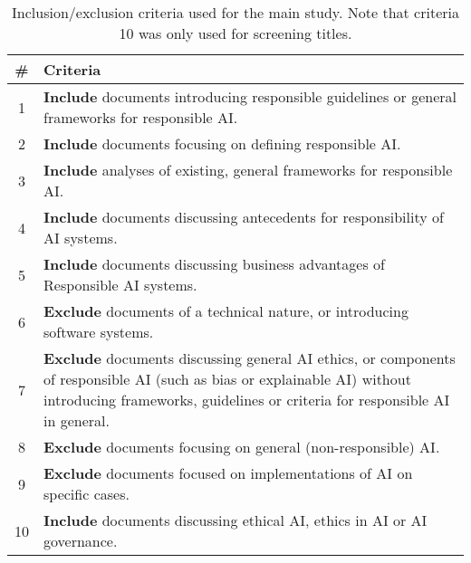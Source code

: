 \begin{table}[htp]
    \centering
    \begin{tabular}{cp{}}
        \textbf{\#} & \textbf{Criteria} \\
        \toprule
        1 & \textbf{Include} documents introducing responsible guidelines or general frameworks for responsible AI. \\
        2 & \textbf{Include} documents focusing on defining responsible AI. \\
        3 & \textbf{Include} analyses of existing, general frameworks for responsible AI. \\
        4 & \textbf{Include} documents discussing antecedents for responsibility of AI systems. \\
        5 & \textbf{Include} documents discussing business advantages of Responsible AI systems. \\
        \midrule
        6 & \textbf{Exclude} documents of a technical nature, or introducing software systems. \\ %
        7 & \textbf{Exclude} documents discussing general AI ethics, or components of responsible AI (such as bias or explainable AI) without introducing frameworks, guidelines or criteria for responsible AI in general. \\
        8 & \textbf{Exclude} documents focusing on general (non-responsible) AI. \\ %
        9 & \textbf{Exclude} documents focused on implementations of AI on specific cases. \\ %
        \midrule
        10 & \textbf{Include} documents discussing ethical AI, ethics in AI or AI governance. \\
    \end{tabular}
    \caption[Inclusion/exclusion criteria used for the main study]{Inclusion/exclusion criteria used for the main study. Note that criteria 10 was only used for screening titles.}
    \label{tab:criteria-main}
\end{table}
